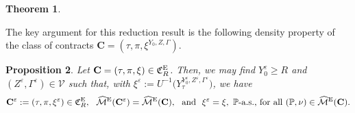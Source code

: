 \documentclass[11pt,a4paper]{article}
\numberwithin{equation}{section}
\def\dbE{\mathbb{E}}
\def\dbP{\mathbb{P}}
\newcommand{\cK}{\mathcal{K}}
\newcommand{\cM}{\mathcal{M}}
\newcommand{\cT}{\mathcal{T}}
\newcommand{\cV}{\mathcal{V}}
\newcommand{\Cbf}{\mathbf{C}}
\def\no{\noindent}
\newtheorem{theorem}{Theorem}[section]
\newtheorem{proposition}[theorem]{Proposition}
\theoremstyle{definition}
\begin{document}
\begin{theorem}
% 
% 
\end{theorem}

The key argument for this reduction result is the following density property of the class of contracts $\Cbf=(\tau,\pi,\xi^{Y_0,Z,\Gamma})$.

\begin{proposition} \label{prop:density}
 Let $\Cbf=(\tau,\pi,\xi)\in\mathfrak{C}^{\rm E}_R$. Then, we may find $Y_0^\varepsilon\geq R$ and $(Z^\varepsilon,\Gamma^\varepsilon)\in\cV$ such that, with $\xi^\varepsilon:=U^{-1}\big(Y^{Y^\varepsilon_0,Z^\varepsilon,\Gamma^\varepsilon}_\tau\big)$, we have 
 $$
 \Cbf^\varepsilon:=(\tau,\pi,\xi^\varepsilon)\in\mathfrak{C}^{\rm E}_R,
 ~~\widehat{\cM}^{\rm E}(\Cbf^\varepsilon)=\widehat{\cM}^{\rm E}(\Cbf),
 ~~\mbox{and}
 ~~\xi^\varepsilon=\xi,~\dbP\mbox{-a.s., for all}~(\dbP,\nu)\in\widehat{\cM}^{\rm E}(\Cbf).
 $$
\end{proposition} 
  
\end{document}
